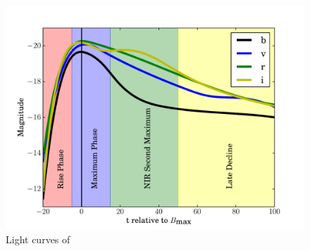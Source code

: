 \begin{figure}[tb] %
   \centering
   \includegraphics[width=\textwidth]{chapter_intro/plots/lightcurve_2002bo.pdf} 
   \caption{Light curves of  \citep[data from ][]{2004MNRAS.348..261B}}
   \label{fig:lightcurve_2002bo}
\end{figure}


